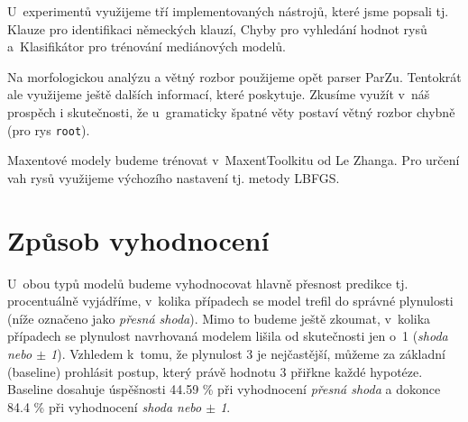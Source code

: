 \documentclass[12pt,a4paper]{report}
\begin{document}
U~experimentů využijeme tří implementovaných nástrojů, které jsme popsali tj. Klauze pro identifikaci německých klauzí, Chyby pro vyhledání hodnot rysů a~Klasifikátor pro trénování mediánových modelů.

Na morfologickou analýzu a větný rozbor použijeme opět parser ParZu. Tentokrát ale využijeme ještě dalších informací, které poskytuje. Zkusíme využít v~náš prospěch i skutečnosti, že u~gramaticky špatné věty postaví větný rozbor chybně (pro rys \texttt{root}).


Maxentové modely budeme trénovat v~MaxentToolkitu od Le Zhanga. Pro určení vah rysů využijeme výchozího nastavení tj. metody LBFGS.


\section{Způsob vyhodnocení}
U~obou typů modelů budeme vyhodnocovat hlavně přesnost predikce tj. procentuálně vyjádříme, v~kolika případech se model trefil do správné plynulosti (níže označeno jako \textit{přesná shoda}). Mimo to budeme ještě zkoumat, v~kolika případech se plynulost navrhovaná modelem lišila od skutečnosti jen o~1 (\textit{shoda nebo $\pm$ 1}). Vzhledem k~tomu, že plynulost 3 je nejčastější, můžeme za základní (baseline) prohlásit postup, který právě hodnotu 3 přiřkne každé hypotéze. Baseline dosahuje úspěšnosti 44.59 \% při vyhodnocení \textit{přesná shoda} a dokonce 84.4 \% při vyhodnocení \textit{shoda nebo $\pm$ 1}.
\end{document}
